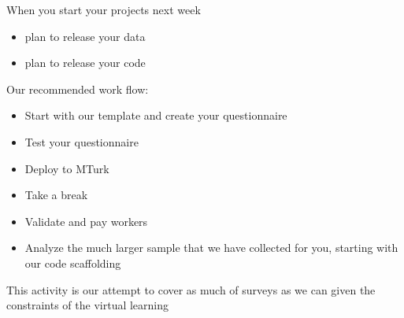 \documentclass[aspectratio=169]{beamer}
\begin{document}
%
%
%
%
%
\begin{frame}

When you start your projects next week
\begin{itemize}
\item plan to release your data
\item plan to release your code
\end{itemize}

\end{frame}
\begin{frame}

Our recommended work flow:
\begin{itemize}
\item Start with our template and create your questionnaire
\item Test your questionnaire
\item Deploy to MTurk
\item Take a break
\item Validate and pay workers
\item Analyze the much larger sample that we have collected for you, starting with our code scaffolding
\end{itemize}
\pause
\vfill
This activity is our attempt to cover as much of surveys as we can given the constraints of the virtual learning
\end{frame}
\end{document}
